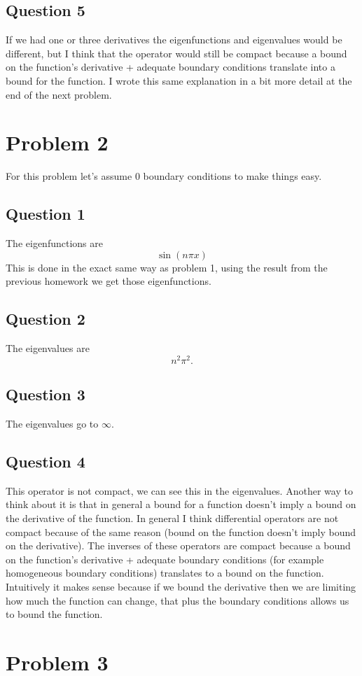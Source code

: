\documentclass[12pt]{article}%
\begin{document}
\subsection*{Question 5}
If we had one or three derivatives the eigenfunctions and eigenvalues would be
different, but I think that the operator would still be compact because a bound
on the function's derivative + adequate boundary conditions translate into a
bound for the function. I wrote this same explanation in a bit more detail at
the end of the next problem.
\section*{Problem 2}
For this problem let's assume 0 boundary conditions to make things easy.
\subsection*{Question 1}
The eigenfunctions are
\[
	\sin(n\pi x)
\]
This is done in the exact same way as problem 1, using the result from the
previous homework we get those eigenfunctions.
\subsection*{Question 2}
The eigenvalues are
\[
n^2\pi^2.
\]
\subsection*{Question 3}
The eigenvalues go to $\infty$.
\subsection*{Question 4}
This operator is not compact, we can see this in the eigenvalues. Another way
to think about it is that in general a bound for a function doesn't imply a
bound on the derivative of the function. In general I think differential
operators are not compact because of the same reason (bound on the function
doesn't imply bound on the derivative). The inverses of these operators are
compact because a bound on the function's derivative + adequate boundary
conditions (for example homogeneous boundary conditions) translates to a bound
on the function. Intuitively it makes sense because if we bound the derivative
then we are limiting how much the function can change, that plus the boundary
conditions allows us to bound the function.
\section*{Problem 3}
\end{document}
